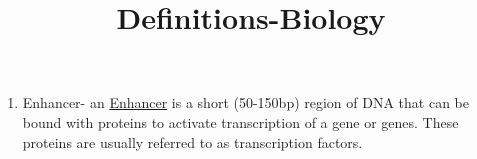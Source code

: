 \documentclass[12pt]{report}
\begin{document}
\title{Definitions-Biology}
\maketitle
\begin{enumerate}
\item{Enhancer}- an \href{http://en.wikipedia.org/wiki/Enhancer_(genetics)}{Enhancer} is a short (50-150bp) region of DNA that can be bound with proteins to activate transcription of a gene or genes. These proteins are usually referred to as transcription factors. 

\end{enumerate}
\end{document}
